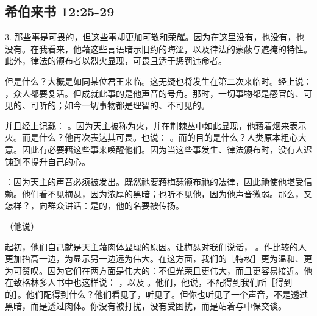 
\subsection{希伯来书 12:25-29}

\par

3. 那些事是可畏的，但这些事却更加可敬和荣耀。因为在这里没有，也没有，也没有。在我看来，他藉这些言语暗示旧约的晦涩，以及律法的蒙蔽与遮掩的特性。此外，律法的颁布者以烈火显现，可畏且适于惩罚违命者。\par

但是什么？大概是如同某位君王来临。这无疑也将发生在第二次来临时。经上说： ，众人都要复活。但成就此事的是他声音的号角。那时，一切事物都是感官的、可见的、可听的；如今一切事物都是理智的、不可见的。\par

并且经上记载： 。因为天主被称为火，并在荆棘丛中如此显现，他藉着烟来表示火。而是什么？他再次表达其可畏。也说： 。而的目的是什么？人类原本粗心大意。因此有必要藉这些事来唤醒他们。因为当这些事发生、律法颁布时，没有人迟钝到不提升自己的心。\par

 ：因为天主的声音必须被发出。既然祂要藉梅瑟颁布祂的法律，因此祂使他堪受信赖。他们看不见梅瑟，因为浓厚的黑暗；也听不见他，因为他声音微弱。那么，又怎样？，向群众讲话：是的，他的名要被传扬。\par

（他说）\par

起初，他们自己就是天主藉肉体显现的原因。让梅瑟对我们说话， 。作比较的人更加抬高一边，为显示另一边远为伟大。在这方面，我们的［特权］更为温和、更为可赞叹。因为它们在两方面是伟大的：不但光荣且更伟大，而且更容易接近。他在致格林多人书中也这样说： ，以及 。他们，他说，不配得到我们所［得到的］。他们配得到什么？他们看见了，听见了。但你也听见了一个声音，不是透过黑暗，而是透过肉体。你没有被打扰，没有受困扰，而是站着与中保交谈。\par

